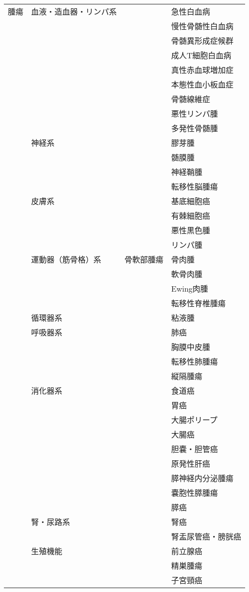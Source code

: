 \begin{xltabular}{\linewidth}{XXXX}
腫瘍 & 血液・造血器・リンパ系 &  & 急性白血病 \\
 &  &  & 慢性骨髄性白血病 \\
 &  &  & 骨髄異形成症候群 \\
 &  &  & 成人T細胞白血病 \\
 &  &  & 真性赤血球増加症 \\
 &  &  & 本態性血小板血症 \\
 &  &  & 骨髄線維症 \\
 &  &  & 悪性リンパ腫 \\
 &  &  & 多発性骨髄腫 \\
 & 神経系 &  & 膠芽腫 \\
 &  &  & 髄膜腫 \\
 &  &  & 神経鞘腫 \\
 &  &  & 転移性脳腫瘍 \\
 & 皮膚系 &  & 基底細胞癌 \\
 &  &  & 有棘細胞癌 \\
 &  &  & 悪性黒色腫 \\
 &  &  & リンパ腫 \\
 & 運動器（筋骨格）系 & 骨軟部腫瘍 & 骨肉腫 \\
 &  &  & 軟骨肉腫 \\
 &  &  & Ewing肉腫 \\
 &  &  & 転移性脊椎腫瘍 \\
 & 循環器系 &  & 粘液腫 \\
 & 呼吸器系 &  & 肺癌 \\
 &  &  & 胸膜中皮腫 \\
 &  &  & 転移性肺腫瘍 \\
 &  &  & 縦隔腫瘍 \\
 & 消化器系 &  & 食道癌 \\
 &  &  & 胃癌 \\
 &  &  & 大腸ポリープ \\
 &  &  & 大腸癌 \\
 &  &  & 胆嚢・胆管癌 \\
 &  &  & 原発性肝癌 \\
 &  &  & 膵神経内分泌腫瘍 \\
 &  &  & 嚢胞性膵腫瘍 \\
 &  &  & 膵癌 \\
 & 腎・尿路系 &  & 腎癌 \\
 &  &  & 腎盂尿管癌・膀胱癌 \\
 & 生殖機能 &  & 前立腺癌 \\
 &  &  & 精巣腫瘍 \\
 &  &  & 子宮頸癌 \\

\end{xltabular}
